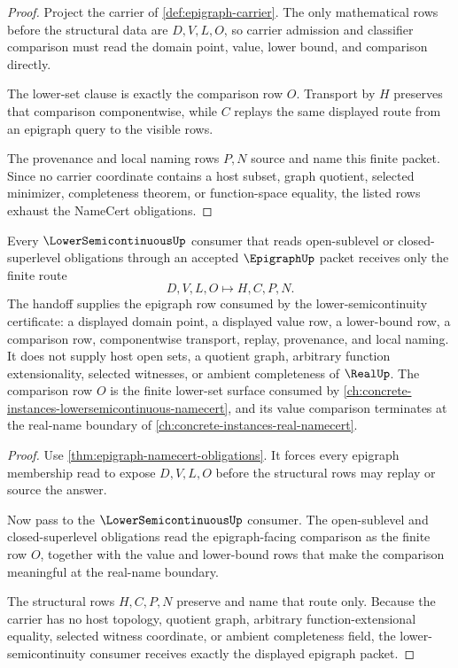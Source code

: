\begin{proof}
Project the carrier of \autoref{def:epigraph-carrier}. The only mathematical rows before the structural data are $D,V,L,O$, so carrier admission and classifier comparison must read the domain point, value, lower bound, and comparison directly.

The lower-set clause is exactly the comparison row $O$. Transport by $H$ preserves that comparison componentwise, while $C$ replays the same displayed route from an epigraph query to the visible rows.

The provenance and local naming rows $P,N$ source and name this finite packet. Since no carrier coordinate contains a host subset, graph quotient, selected minimizer, completeness theorem, or function-space equality, the listed rows exhaust the NameCert obligations.
\end{proof}

\begin{theorem}
\label{thm:epigraph-lower-semicontinuous-handoff}
Every $\LowerSemicontinuousUp$ consumer that reads open-sublevel or closed-superlevel obligations through an accepted $\EpigraphUp$ packet receives only the finite route
$$
D,V,L,O \longmapsto H,C,P,N.
$$
The handoff supplies the epigraph row consumed by the lower-semicontinuity certificate: a displayed domain point, a displayed value row, a lower-bound row, a comparison row, componentwise transport, replay, provenance, and local naming. It does not supply host open sets, a quotient graph, arbitrary function extensionality, selected witnesses, or ambient completeness of $\RealUp$.
The comparison row $O$ is the finite lower-set surface consumed by \autoref{ch:concrete-instances-lowersemicontinuous-namecert}, and its value comparison terminates at the real-name boundary of \autoref{ch:concrete-instances-real-namecert}.
\end{theorem}
\begin{proof}
Use \autoref{thm:epigraph-namecert-obligations}. It forces every epigraph membership read to expose $D,V,L,O$ before the structural rows may replay or source the answer.

Now pass to the $\LowerSemicontinuousUp$ consumer. The open-sublevel and closed-superlevel obligations read the epigraph-facing comparison as the finite row $O$, together with the value and lower-bound rows that make the comparison meaningful at the real-name boundary.

The structural rows $H,C,P,N$ preserve and name that route only. Because the carrier has no host topology, quotient graph, arbitrary function-extensional equality, selected witness coordinate, or ambient completeness field, the lower-semicontinuity consumer receives exactly the displayed epigraph packet.
\end{proof}

